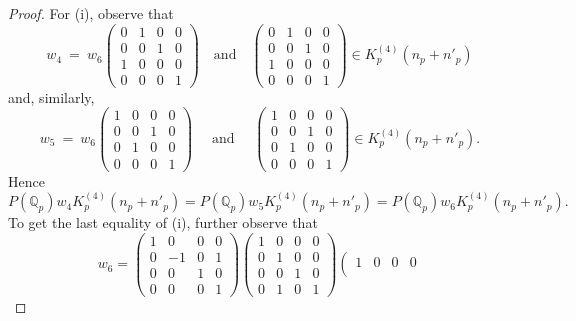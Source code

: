 \documentclass[11pt]{amsart}
\newcommand{\mirp}[1]{K_p^{(4)}(#1)}
\begin{document}
\begin{proof}
For (i), observe that
$$%
		w_4 \ = \ w_6\left(\begin{smallmatrix}
			0 & 1 & 0 & 0 \\
			0 & 0 & 1 & 0 \\
			1 & 0 & 0 & 0 \\
			0 & 0 & 0 & 1
		\end{smallmatrix}\right) 
		\quad \text{and} \quad 
		\left(\begin{smallmatrix}
			0 & 1 & 0 & 0 \\
			0 & 0 & 1 & 0 \\
			1 & 0 & 0 & 0 \\
			0 & 0 & 0 & 1
		\end{smallmatrix}\right) \in \mirp{n_p + n'_p}
$$
and, similarly, 
$$
w_5 \ = \ w_6 \left(\begin{smallmatrix}
			1 & 0 & 0 & 0 \\
			0 & 0 & 1 & 0 \\
			0 & 1 & 0 & 0 \\
			0 & 0 & 0 & 1
		\end{smallmatrix}\right)
		\quad \text{ and } \quad 
		\left(\begin{smallmatrix}
			1 & 0 & 0 & 0 \\
			0 & 0 & 1 & 0 \\
			0 & 1 & 0 & 0 \\
			0 & 0 & 0 & 1
		\end{smallmatrix}\right) \in \mirp{n_p + n'_p}.
$$
Hence $P(\mathbb{Q}_p)w_4 \mirp{n_p + n'_p} = P(\mathbb{Q}_p)w_5 \mirp{n_p + n'_p} =
	P(\mathbb{Q}_p)w_6 \mirp{n_p + n'_p}.$ To get the last equality of (i), further observe that
	\begin{equation*}
		w_6=
		\left(\begin{smallmatrix}
			1 & 0 & 0 & 0 \\
			0 & -1 & 0 & 1 \\
			0 & 0 & 1 & 0 \\
			0 & 0 & 0 & 1
		\end{smallmatrix}\right)
		\left(\begin{smallmatrix}
			1 & 0 & 0 & 0 \\
			0 & 1 & 0 & 0 \\
			0 & 0 & 1 & 0 \\
			0 & 1 & 0 & 1
		\end{smallmatrix}\right)
		\left(\begin{smallmatrix}
			1 & 0 & 0 & 0 \\

\end{smallmatrix}
\end{equation*}
\end{proof}
\end{document}
